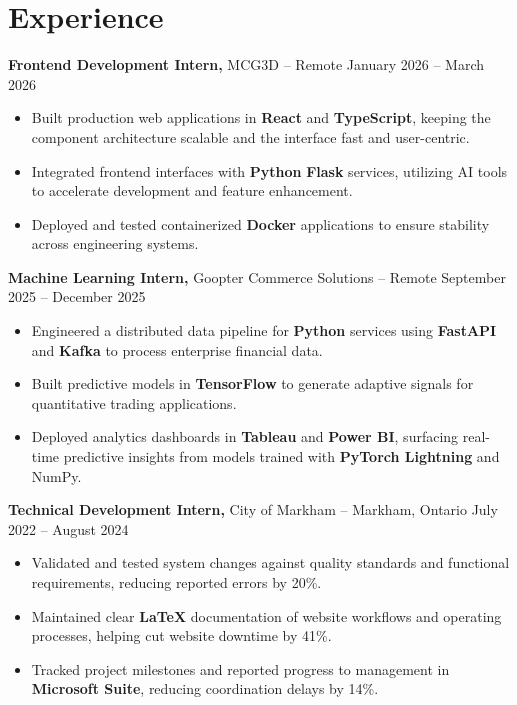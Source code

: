 \documentclass[11pt]{article}
\begin{document}
\section*{Experience}

\smallskip
\textbf{Frontend Development Intern,} {MCG3D} -- Remote \hfill January 2026 -- March 2026 \\
\begin{itemize}
  \item Built production web applications in \textbf{React} and \textbf{TypeScript}, keeping the component architecture scalable and the interface fast and user-centric.
  \item Integrated frontend interfaces with \textbf{Python} \textbf{Flask} services, utilizing AI tools to accelerate development and feature enhancement.
  \item Deployed and tested containerized \textbf{Docker} applications to ensure stability across engineering systems.
\end{itemize}

\smallskip
\textbf{Machine Learning Intern,} {Goopter Commerce Solutions} -- Remote \hfill September 2025 -- December 2025 \\
\begin{itemize}
  \item Engineered a distributed data pipeline for \textbf{Python} services using \textbf{FastAPI} and \textbf{Kafka} to process enterprise financial data.
  \item Built predictive models in \textbf{TensorFlow} to generate adaptive signals for quantitative trading applications.
  \item Deployed analytics dashboards in \textbf{Tableau} and \textbf{Power BI}, surfacing real-time predictive insights from models trained with \textbf{PyTorch Lightning} and NumPy.
\end{itemize}

\smallskip
\textbf{Technical Development Intern,} {City of Markham} -- Markham, Ontario \hfill July 2022 -- August 2024 \\
\begin{itemize}
  \item Validated and tested system changes against quality standards and functional requirements, reducing reported errors by 20\%.
  \item Maintained clear \textbf{LaTeX} documentation of website workflows and operating processes, helping cut website downtime by 41\%.
  \item Tracked project milestones and reported progress to management in \textbf{Microsoft Suite}, reducing coordination delays by 14\%.
\end{itemize}
\end{document}

